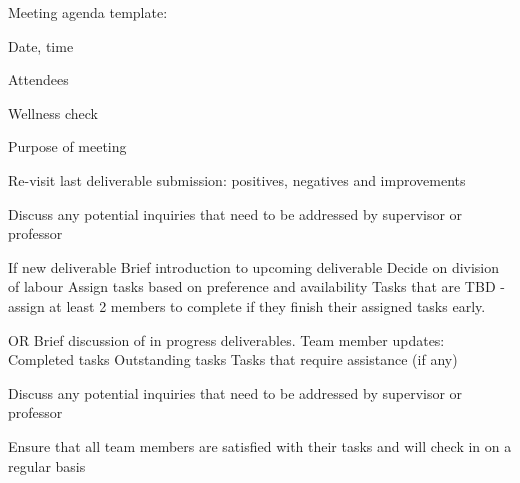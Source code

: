 Meeting agenda template:

Date, time

Attendees

Wellness check 

Purpose of meeting

Re-visit last deliverable submission: positives, negatives and improvements

Discuss any potential inquiries that need to be addressed by supervisor or professor

If new deliverable
Brief introduction to upcoming deliverable
Decide on division of labour
Assign tasks based on preference and availability
Tasks that are TBD - assign at least 2 members to complete if they finish their assigned tasks early.

OR
Brief discussion of in progress deliverables.
Team member updates:
Completed tasks
Outstanding tasks 
Tasks that require assistance (if any)

Discuss any potential inquiries that need to be addressed by supervisor or professor

Ensure that all team members are satisfied with their tasks and will check in on a regular basis 
